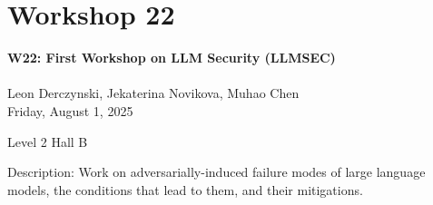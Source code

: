 \clearpage


\section[W22: First Workshop on LLM Security (LLMSEC)]{Workshop 22}
\label{workshop_22}

\begin{center}
    {\Large \textbf{W22: First Workshop on LLM Security (LLMSEC)}}\\
    
\\

Leon Derczynski, Jekaterina Novikova, Muhao Chen\\

    Friday, August 1, 2025

   Level 2 Hall B
    
\end{center}

Description: Work on adversarially-induced failure modes of large language models, the conditions that lead to them, and their mitigations.

